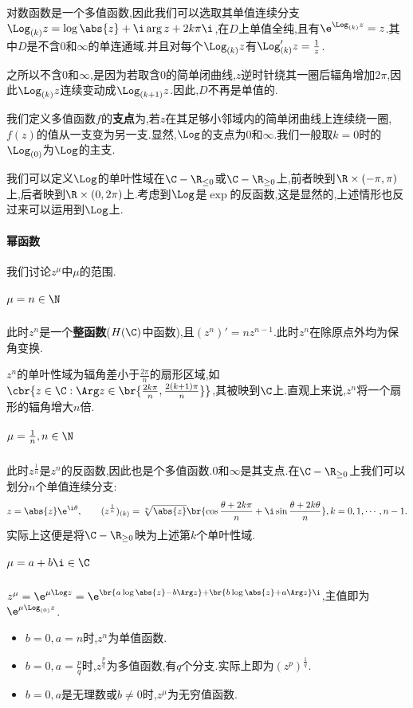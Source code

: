 \documentclass{article}
\begin{document}
对数函数是一个多值函数,因此我们可以选取其单值连续分支$\Log_{(k)}z=\log \abs{z}+\i\arg z+2k\pi\i$,在$D$上单值全纯,且有$\e^{\Log_{(k)}z}=z$.其中$D$是不含0和$\infty$的单连通域.并且对每个$\Log_{(k)}z$有$\Log_{(k)}'z=\frac{1}{z}$.

之所以不含0和$\infty$,是因为若取含0的简单闭曲线,$z$逆时针绕其一圈后辐角增加$2\pi$,因此$\Log_{(k)} z$连续变动成$\Log_{(k+1)}z$.因此,$D$不再是单值的.

我们定义多值函数$f$的\textbf{支点}为,若$z$在其足够小邻域内的简单闭曲线上连续绕一圈,$f(z)$的值从一支变为另一支.显然,$\Log$的支点为0和$\infty$.我们一般取$k=0$时的$\Log_{(0)}$为$\Log$的主支.

我们可以定义$\Log$的单叶性域在$\C-\R_{\leq 0}$或$\C-\R_{\geq 0}$上,前者映到$\R\times(-\pi,\pi)$上,后者映到$\R\times(0,2\pi)$上.考虑到$\Log$是$\exp$的反函数,这是显然的,上述情形也反过来可以运用到$\Log$上.

\paragraph{幂函数}我们讨论$z^\mu$中$\mu$的范围.
\subparagraph{$\mu=n\in\N$}此时$z^n$是一个\textbf{整函数}($H(\C)$中函数),且$(z^n)'=nz^{n-1}$.此时$z^n$在除原点外均为保角变换.

$z^n$的单叶性域为辐角差小于$\frac{2\pi}{n}$的扇形区域,如$\cbr{z\in\C:\Arg z\in \br{\frac{2k\pi}{n},\frac{2(k+1)\pi}{n}}}$,其被映到$\C$上.直观上来说,$z^n$将一个扇形的辐角增大$n$倍.

\subparagraph{$\mu=\frac{1}{n},n\in \N$}此时$z^{\frac{1}{n}}$是$z^n$的反函数,因此也是个多值函数.0和$\infty$是其支点.在$\C-\R_{\geq 0}$上我们可以划分$n$个单值连续分支:
$$z=\abs{z}\e^{\i\theta},\qquad (z^{\frac{1}{n}})_{(k)}=\sqrt[n]{\abs{z}}\br{\cos\frac{\theta+2k\pi}{n}+\i\sin\frac{\theta+2k\theta}{n}},k=0,1,\cdots,n-1.$$
实际上这便是将$\C-\R_{\geq 0}$映为上述第$k$个单叶性域.

\subparagraph{$\mu=a+b\i\in \C$}$z^\mu=\e^{\mu\Log z}=\e^{\br{a\log\abs{z}-b\Arg z}+\br{b\log\abs{z}+a\Arg z}\i}$,主值即为$\e^{\mu\Log_{(0)} z}$.
\begin{itemize}
    \item $b=0,a=n$时,$z^n$为单值函数.
    \item $b=0,a=\frac{p}{q}$时,$z^{\frac{p}{q}}$为多值函数,有$q$个分支.实际上即为$(z^p)^\frac{1}{q}$.
    \item $b=0,a$是无理数或$b\neq 0$时,$z^\mu$为无穷值函数.
\end{itemize}
\end{document}
